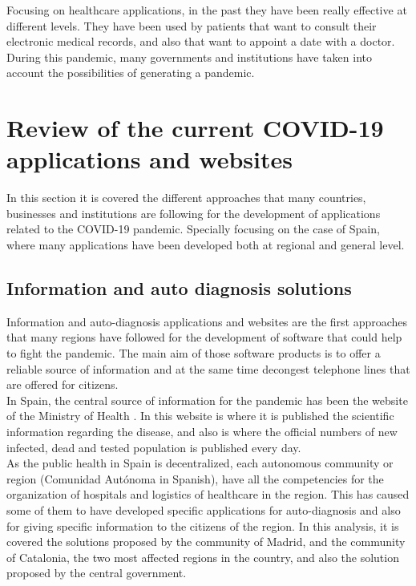 \documentclass[a4paper, 12pt]{article}
\begin{document}
Focusing on healthcare applications, in the past they have been really effective at different levels. They have been used by patients that want to consult their electronic medical records, and also that want to appoint a date with a doctor. During this pandemic, many governments and institutions have taken into account the possibilities of generating a pandemic.


\section{Review of the current COVID-19 applications and websites}
\label{section:review}

In this section it is covered the different approaches that many countries, businesses and institutions are following for the development of applications related to the COVID-19 pandemic. Specially focusing on the case of Spain, where many applications have been developed both at regional and general level.

\subsection{Information and auto diagnosis solutions}

Information and auto-diagnosis applications and websites are the first approaches that many regions have followed for the development of software that could help to fight the pandemic. The main aim of those software products is to offer a reliable source of information and at the same time decongest telephone lines that are offered for citizens. \\

In Spain, the central source of information for the pandemic has been the website of the Ministry of Health \cite{ministerio-sanidad}. In this website is where it is published the scientific information regarding the disease, and also is where the official numbers of new infected, dead and tested population is published every day.\\

As the public health in Spain is decentralized, each autonomous community or region (Comunidad Autónoma in Spanish), have all the competencies for the organization of hospitals and logistics of healthcare in the region. This has caused some of them to have developed specific applications for auto-diagnosis and also for giving specific information to the citizens of the region. In this analysis, it is covered the solutions proposed by the community of Madrid, and the community of Catalonia, the two most affected regions in the country, and also the solution proposed by the central government.
\end{document}
